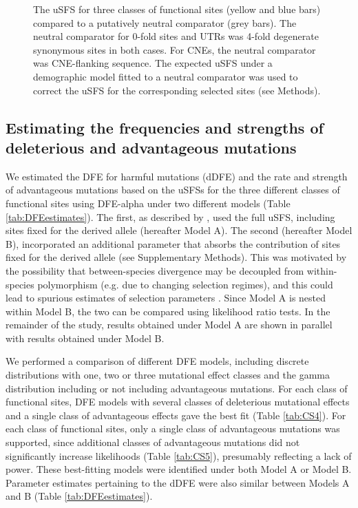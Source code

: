  \begin{figure}[H]
   \centering      
   \noindent{}
 \caption[The uSFS for multiple classes of sites in the \textit{M. m. castaneus} genome]{The uSFS for three classes of functional sites (yellow and blue bars) compared to a putatively neutral comparator (grey bars). The neutral comparator for 0-fold sites and UTRs was 4-fold degenerate synonymous sites in both cases. For CNEs, the neutral comparator was CNE-flanking sequence. The expected uSFS under a demographic model fitted to a neutral comparator was used to correct the uSFS for the corresponding selected sites (see Methods).}
 \label{fig:uSFS_data}
\end{figure}


\subsection{Estimating the frequencies and strengths of deleterious and advantageous mutations}

	We estimated the DFE for harmful mutations (dDFE) and the rate and strength of advantageous mutations based on the uSFSs for the three different classes of functional sites using DFE-alpha under two different models (Table \ref{tab:DFEestimates}). The first, as described by \cite{RN210}, used the full uSFS, including sites fixed for the derived allele (hereafter Model A). The second (hereafter Model B), incorporated an additional parameter that absorbs the contribution of sites fixed for the derived allele (see Supplementary Methods). This was motivated by the possibility that between-species divergence may be decoupled from within-species polymorphism (e.g. due to changing selection regimes), and this could lead to spurious estimates of selection parameters \cite{RN165, RN354}. Since Model A is nested within Model B, the two can be compared using likelihood ratio tests. In the remainder of the study, results obtained under Model A are shown in parallel with results obtained under Model B. 

\linespread{1}

\linespread{2}

	We performed a comparison of different DFE models, including discrete distributions with one, two or three mutational effect classes and the gamma distribution including or not including advantageous mutations. For each class of functional sites, DFE models with several classes of deleterious mutational effects and a single class of advantageous effects gave the best fit (Table \ref{tab:CS4}). For each class of functional sites, only a single class of advantageous mutations was supported, since additional classes of advantageous mutations did not significantly increase likelihoods (Table \ref{tab:CS5}), presumably reflecting a lack of power. These best-fitting models were identified under both Model A or Model B. Parameter estimates pertaining to the dDFE were also similar between Models A and B (Table \ref{tab:DFEestimates}). 

